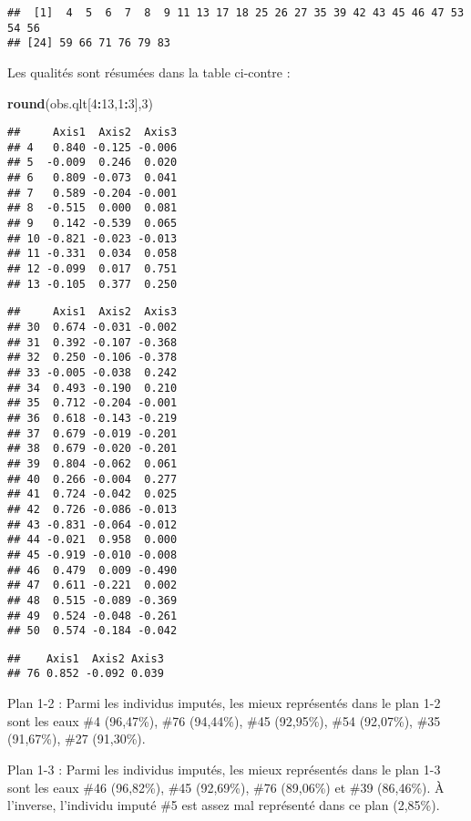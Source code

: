 \documentclass[]{article}
\newenvironment{Shaded}{\begin{snugshade}}{\end{snugshade}}
\newcommand{\KeywordTok}[1]{\textcolor[rgb]{0.13,0.29,0.53}{\textbf{#1}}}
\newcommand{\DecValTok}[1]{\textcolor[rgb]{0.00,0.00,0.81}{#1}}
\newcommand{\OperatorTok}[1]{\textcolor[rgb]{0.81,0.36,0.00}{\textbf{#1}}}
\newcommand{\NormalTok}[1]{#1}
\begin{document}
\begin{verbatim}
##  [1]  4  5  6  7  8  9 11 13 17 18 25 26 27 35 39 42 43 45 46 47 53 54 56
## [24] 59 66 71 76 79 83
\end{verbatim}

Les qualités sont résumées dans la table ci-contre :

\begin{Shaded}
\begin{Highlighting}[]
\KeywordTok{round}\NormalTok{(obs.qlt[}\DecValTok{4}\OperatorTok{:}\DecValTok{13}\NormalTok{,}\DecValTok{1}\OperatorTok{:}\DecValTok{3}\NormalTok{],}\DecValTok{3}\NormalTok{)}
\end{Highlighting}
\end{Shaded}

\begin{verbatim}
##     Axis1  Axis2  Axis3
## 4   0.840 -0.125 -0.006
## 5  -0.009  0.246  0.020
## 6   0.809 -0.073  0.041
## 7   0.589 -0.204 -0.001
## 8  -0.515  0.000  0.081
## 9   0.142 -0.539  0.065
## 10 -0.821 -0.023 -0.013
## 11 -0.331  0.034  0.058
## 12 -0.099  0.017  0.751
## 13 -0.105  0.377  0.250
\end{verbatim}

\begin{verbatim}
##     Axis1  Axis2  Axis3
## 30  0.674 -0.031 -0.002
## 31  0.392 -0.107 -0.368
## 32  0.250 -0.106 -0.378
## 33 -0.005 -0.038  0.242
## 34  0.493 -0.190  0.210
## 35  0.712 -0.204 -0.001
## 36  0.618 -0.143 -0.219
## 37  0.679 -0.019 -0.201
## 38  0.679 -0.020 -0.201
## 39  0.804 -0.062  0.061
## 40  0.266 -0.004  0.277
## 41  0.724 -0.042  0.025
## 42  0.726 -0.086 -0.013
## 43 -0.831 -0.064 -0.012
## 44 -0.021  0.958  0.000
## 45 -0.919 -0.010 -0.008
## 46  0.479  0.009 -0.490
## 47  0.611 -0.221  0.002
## 48  0.515 -0.089 -0.369
## 49  0.524 -0.048 -0.261
## 50  0.574 -0.184 -0.042
\end{verbatim}

\begin{verbatim}
##    Axis1  Axis2 Axis3
## 76 0.852 -0.092 0.039
\end{verbatim}

Plan 1-2 : Parmi les individus imputés, les mieux représentés dans le
plan 1-2 sont les eaux \#4 (96,47\%), \#76 (94,44\%), \#45 (92,95\%),
\#54 (92,07\%), \#35 (91,67\%), \#27 (91,30\%).

Plan 1-3 : Parmi les individus imputés, les mieux représentés dans le
plan 1-3 sont les eaux \#46 (96,82\%), \#45 (92,69\%), \#76 (89,06\%) et
\#39 (86,46\%). À l'inverse, l'individu imputé \#5 est assez mal
représenté dans ce plan (2,85\%).
\end{document}
